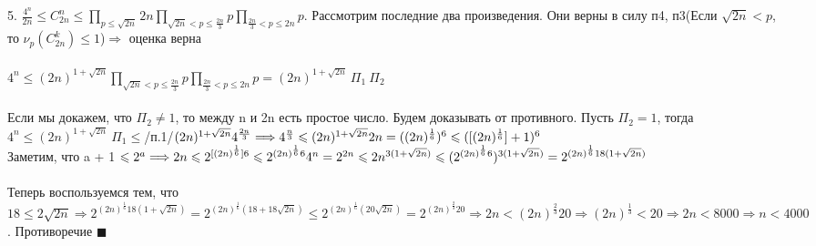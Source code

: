 5. $\frac{4^n}{2n} \leq C_{2n}^n \leq \prod\limits_{p \leq \sqrt{2n}} 2n\prod\limits_{\sqrt{2n} < p \leq \frac{2n}{3}}p \prod\limits_{\frac{2n}{3} < p \leq 2n}p$. Рассмотрим последние два произведения. Они верны в силу п4, п3(Если $\sqrt{2n} < p$, то $ \nu_p(C_{2n}^k) \leq 1$)$ \Longrightarrow$ оценка верна \\ \\
$4^n \leq (2n)^{1 + \sqrt{2n}} \prod\limits_{\sqrt{2n} < p \leq \frac{2n}{3}}p \prod\limits_{\frac{2n}{3} < p \leq 2n}p = (2n)^{1 + \sqrt{2n}} \ \Pi_1 \  \Pi_2 $ \\ \\ Если мы докажем, что $\Pi_2 \neq 1$, то между n и 2n есть простое число. Будем доказывать от противного. Пусть $\Pi_2 = 1$, тогда \\ $4^n \leq (2n)^{1 + \sqrt{2n}} \ \Pi_1 \leq$/п.1/$ (2n)^{1 + \sqrt{2n}} 4^{\frac{2n}{3}} \Longrightarrow 4^{\frac{n}{3}} \leq  (2n)^{1 + \sqrt{2n}} \\ \\ 2n = ((2n)^{\frac{1}{6}})^6 \leq ([(2n)^{\frac{1}{6}}] + 1)^6$ \\ Заметим, что a + 1 $\leq 2^a \Longrightarrow 2n \leq 2^{[(2n)^{\frac{1}{6}}]6} \leq 2^{(2n)^{\frac{1}{6}}6} \\ \\ 4^n = 2^{2n} \leq 2n^{3(1 + \sqrt{2n})} \leq (2^{(2n)^{\frac{1}{6}}6})^{3(1 + \sqrt{2n})} = 2^{(2n)^{\frac{1}{6}}18(1 + \sqrt{2n})} $ \\ \\ Теперь воспользуемся тем, что $18 \leq 2\sqrt{2n} \Longrightarrow 2^{(2n)^{\frac{1}{6}}18(1 + \sqrt{2n})} = 2^{(2n)^{\frac{1}{6}}(18 + 18\sqrt{2n})} \leq 2^{(2n)^{\frac{1}{6}}(20\sqrt{2n})} = 2^{(2n)^{\frac{2}{3}}20} \Longrightarrow 2n < (2n)^{\frac{2}{3}}20 \Longrightarrow (2n)^{\frac{1}{3}} < 20 \Longrightarrow 2n < 8000 \Longrightarrow n < 4000$. Противоречие $\blacksquare$